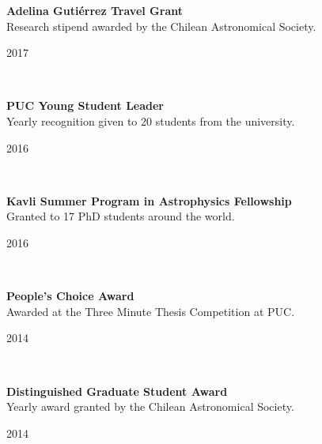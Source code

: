 \documentclass[12pt, a4paper]{article} %
\begin{document}
\begin{minipage}[t]{0.7\textwidth}
\begin{flushleft}%
  \setlength{\leftskip}{0.2cm}%
\textbf{Adelina Guti\'errez Travel Grant}\\
Research stipend awarded by the Chilean Astronomical Society.
\end{flushleft}
\end{minipage}
\begin{minipage}[t]{0.3\textwidth}
\hfill 2017
\end{minipage}\\

\begin{minipage}[t]{0.7\textwidth}
\begin{flushleft}%
  \setlength{\leftskip}{0.2cm}%
\textbf{PUC Young Student Leader}\\
Yearly recognition given to 20 students from the university.
\end{flushleft}
\end{minipage}
\begin{minipage}[t]{0.3\textwidth}
\hfill 2016
\end{minipage}\\

\begin{minipage}[t]{0.7\textwidth}
\begin{flushleft}%
  \setlength{\leftskip}{0.2cm}%
\textbf{Kavli Summer Program in Astrophysics Fellowship}\\
Granted to 17 PhD students around the world.
\end{flushleft}
\end{minipage}
\begin{minipage}[t]{0.3\textwidth}
\hfill 2016
\end{minipage}\\

\begin{minipage}[t]{0.7\textwidth}
\begin{flushleft}%
  \setlength{\leftskip}{0.2cm}%
\textbf{People's Choice Award}\\
 Awarded at the Three Minute Thesis\textsuperscript{\textregistered} Competition at PUC.
 \end{flushleft}
\end{minipage}
\begin{minipage}[t]{0.3\textwidth}
\hfill 2014
\end{minipage}\\

\begin{minipage}[t]{0.7\textwidth}
\begin{flushleft}%
  \setlength{\leftskip}{0.2cm}%
\textbf{Distinguished Graduate Student Award}\\
 Yearly award granted by the Chilean Astronomical Society.
 \end{flushleft}
\end{minipage}
\begin{minipage}[t]{0.3\textwidth}
\hfill 2014
\end{minipage}\\
\end{document}
